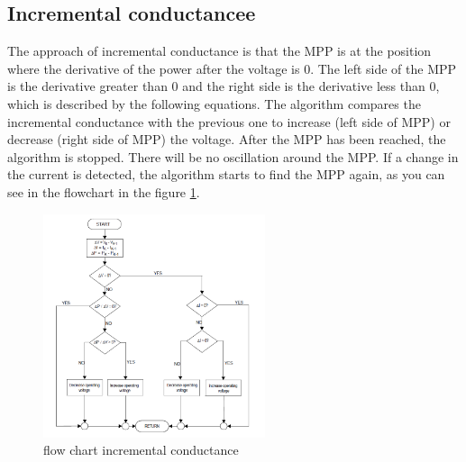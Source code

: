\subsection{Incremental conductancee}
The approach of incremental conductance is that the MPP is at the position where the derivative of the power after the voltage is 0. The left side of the MPP is the derivative greater than 0 and the right side is the derivative less than 0, which is described by the following equations.\newline
The algorithm compares the incremental conductance with the previous one to increase (left side of MPP) or decrease (right side of MPP) the voltage.  After the MPP has been reached, the algorithm is stopped. There will be no oscillation around the MPP. If a change in the current is detected, the algorithm starts to find the MPP again, as you can see in the flowchart in the figure \ref{fcinccon}\cite{}.
\begin{figure}[H]
	\begin{center}
		\includegraphics[width=0.58\textwidth]{../Pictures/P1/Flow_chart/flow_chart_incremental_conductance}
		\caption{flow chart incremental conductance }
		\label{fcinccon}
	\end{center}	
\end{figure}


